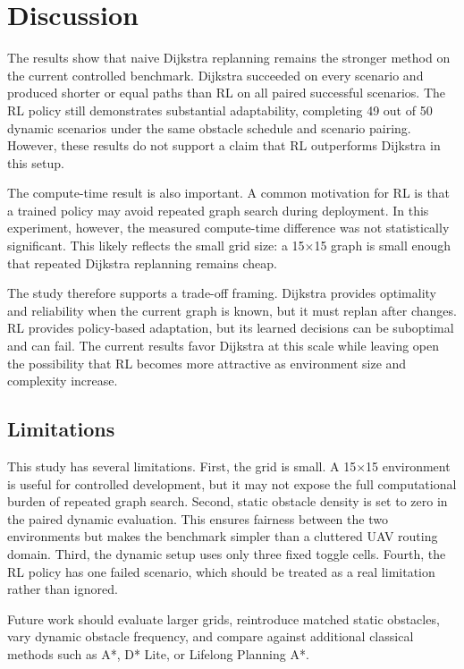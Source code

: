 \section{Discussion}
\label{sec:discussion}

The results show that naive Dijkstra replanning remains the stronger method on the current controlled benchmark. Dijkstra succeeded on every scenario and produced shorter or equal paths than RL on all paired successful scenarios. The RL policy still demonstrates substantial adaptability, completing 49 out of 50 dynamic scenarios under the same obstacle schedule and scenario pairing. However, these results do not support a claim that RL outperforms Dijkstra in this setup.

The compute-time result is also important. A common motivation for RL is that a trained policy may avoid repeated graph search during deployment. In this experiment, however, the measured compute-time difference was not statistically significant. This likely reflects the small grid size: a 15$\times$15 graph is small enough that repeated Dijkstra replanning remains cheap.

The study therefore supports a trade-off framing. Dijkstra provides optimality and reliability when the current graph is known, but it must replan after changes. RL provides policy-based adaptation, but its learned decisions can be suboptimal and can fail. The current results favor Dijkstra at this scale while leaving open the possibility that RL becomes more attractive as environment size and complexity increase.

\subsection{Limitations}

This study has several limitations. First, the grid is small. A 15$\times$15 environment is useful for controlled development, but it may not expose the full computational burden of repeated graph search. Second, static obstacle density is set to zero in the paired dynamic evaluation. This ensures fairness between the two environments but makes the benchmark simpler than a cluttered UAV routing domain. Third, the dynamic setup uses only three fixed toggle cells. Fourth, the RL policy has one failed scenario, which should be treated as a real limitation rather than ignored.

Future work should evaluate larger grids, reintroduce matched static obstacles, vary dynamic obstacle frequency, and compare against additional classical methods such as A*, D* Lite, or Lifelong Planning A*.
